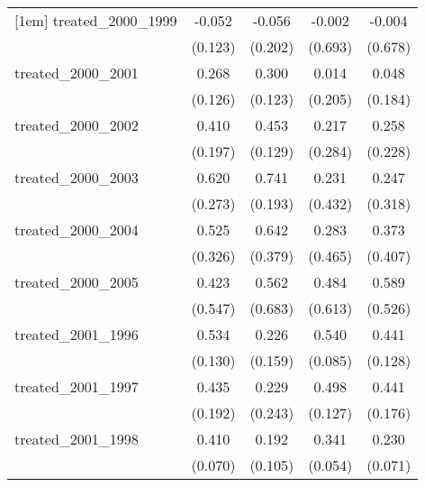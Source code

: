 {\begin{tabular}{l*{4}{c}}
[1em]
treated\_2000\_1999&      -0.052         &      -0.056         &      -0.002         &      -0.004         \\
            &     (0.123)         &     (0.202)         &     (0.693)         &     (0.678)         \\
[1em]
treated\_2000\_2001&       0.268\sym{*}  &       0.300\sym{*}  &       0.014         &       0.048         \\
            &     (0.126)         &     (0.123)         &     (0.205)         &     (0.184)         \\
[1em]
treated\_2000\_2002&       0.410\sym{*}  &       0.453\sym{***}&       0.217         &       0.258         \\
            &     (0.197)         &     (0.129)         &     (0.284)         &     (0.228)         \\
[1em]
treated\_2000\_2003&       0.620\sym{*}  &       0.741\sym{***}&       0.231         &       0.247         \\
            &     (0.273)         &     (0.193)         &     (0.432)         &     (0.318)         \\
[1em]
treated\_2000\_2004&       0.525         &       0.642         &       0.283         &       0.373         \\
            &     (0.326)         &     (0.379)         &     (0.465)         &     (0.407)         \\
[1em]
treated\_2000\_2005&       0.423         &       0.562         &       0.484         &       0.589         \\
            &     (0.547)         &     (0.683)         &     (0.613)         &     (0.526)         \\
[1em]
treated\_2001\_1996&       0.534\sym{***}&       0.226         &       0.540\sym{***}&       0.441\sym{***}\\
            &     (0.130)         &     (0.159)         &     (0.085)         &     (0.128)         \\
[1em]
treated\_2001\_1997&       0.435\sym{*}  &       0.229         &       0.498\sym{***}&       0.441\sym{*}  \\
            &     (0.192)         &     (0.243)         &     (0.127)         &     (0.176)         \\
[1em]
treated\_2001\_1998&       0.410\sym{***}&       0.192         &       0.341\sym{***}&       0.230\sym{**} \\
            &     (0.070)         &     (0.105)         &     (0.054)         &     (0.071)         \\

\end{tabular}}

